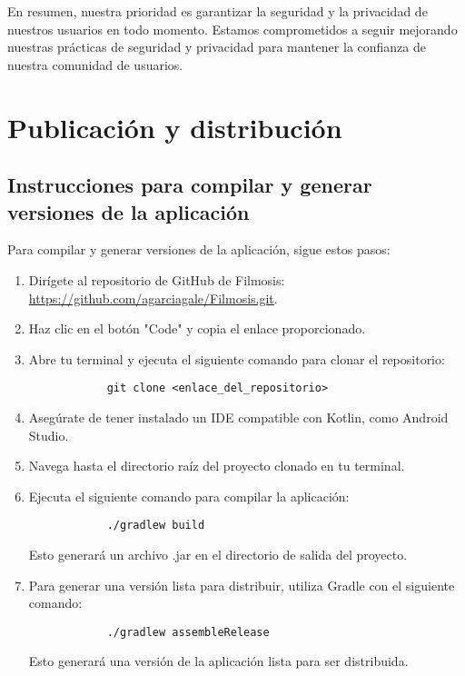 \documentclass{article}
\begin{document}
    En resumen, nuestra prioridad es garantizar la seguridad y la privacidad de nuestros usuarios en todo momento. Estamos comprometidos a seguir mejorando nuestras prácticas de seguridad y privacidad para mantener la confianza de nuestra comunidad de usuarios.

\section{Publicación y distribución}

    \subsection{Instrucciones para compilar y generar versiones de la aplicación}

    Para compilar y generar versiones de la aplicación, sigue estos pasos:
    
    \begin{enumerate}
        \item Dirígete al repositorio de GitHub de Filmosis: \url{https://github.com/agarciagale/Filmosis.git}.
        
        \item Haz clic en el botón "Code" y copia el enlace proporcionado.
        
        \item Abre tu terminal y ejecuta el siguiente comando para clonar el repositorio:
        \begin{verbatim}
            git clone <enlace_del_repositorio>
        \end{verbatim}
        
        \item Asegúrate de tener instalado un IDE compatible con Kotlin, como Android Studio.
        
        \item Navega hasta el directorio raíz del proyecto clonado en tu terminal.
        
        \item Ejecuta el siguiente comando para compilar la aplicación:
        \begin{verbatim}
            ./gradlew build
        \end{verbatim}
        Esto generará un archivo .jar en el directorio de salida del proyecto.
        
        \item Para generar una versión lista para distribuir, utiliza Gradle con el siguiente comando:
        \begin{verbatim}
            ./gradlew assembleRelease
        \end{verbatim}
        Esto generará una versión de la aplicación lista para ser distribuida.
    \end{enumerate}
    
\end{document}
